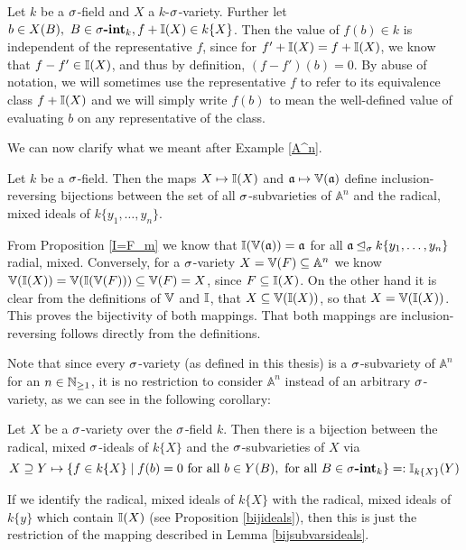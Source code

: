 \begin{rem}
Let $k$ be a $\sigma$-field and $X$ a $k$-$\sigma$-variety. Further let $b \in X(B), ~ B \in \sigma\text{{\normalfont\textbf{-int}}}_k, f + \mathbb{I}(X) \in k\{X\}$. Then the value of $f(b) \in k$ is independent of the representative $f$,
since for $f' + \mathbb{I}(X) = f + \mathbb{I}(X)$, we know that $f - f' \in \mathbb{I}(X)$, and thus by definition, $(f - f')(b) = 0$. By abuse of notation,
we will sometimes use the representative $f$ to refer to its equivalence class $f + \mathbb{I}(X)$ and we will simply write $f(b)$ to mean the well-defined value of evaluating $b$ on any representative of the class.
\end{rem}

We can now clarify what we meant after Example \ref{A^n}.

 \begin{lem}\label{bijsubvarsideals}
Let $k$ be a $\sigma$-field. Then the maps $X \mapsto \mathbb{I}(X)$ and $\mathfrak{a} \mapsto \mathbb{V}(\mathfrak{a})$ define inclusion-reversing bijections between the set of all $\sigma$-subvarieties of $\mathbb{A}^n$ and the radical, mixed ideals of $k\{y_1,\ldots,y_n\}$.
\begin{bew}
From Proposition \ref{I=F_m} we know that $\mathbb{I}(\mathbb{V}(\mathfrak{a})) = \mathfrak{a}$ for all $\mathfrak{a} \unlhd_{\sigma} k\{y_1,\ldots,y_n\}$ radial, mixed. Conversely, for a $\sigma$-variety $X = \mathbb{V}(F) \subseteq \mathbb{A}^n$ we know  $\mathbb{V}(\mathbb{I}(X)) = \mathbb{V}(\mathbb{I}(\mathbb{V}(F))) \subseteq \mathbb{V}(F) = X$,
 since $F \subseteq \mathbb{I}(X)$. On the other hand it is clear from the definitions of $\mathbb{V}$ and $ \mathbb{I}$, that $X \subseteq \mathbb{V}(\mathbb{I}(X))$, so that $X = \mathbb{V}(\mathbb{I}(X))$. This proves the bijectivity of both mappings. That both mappings are inclusion-reversing follows directly from the definitions.
\end{bew}
\end{lem}

Note that since every $\sigma$-variety (as defined in this thesis) is a $\sigma$-subvariety of $\mathbb{A}^n$ for an $n \in \mathbb{N}_{\geq1}$, it is no restriction to consider $\mathbb{A}^n$ instead of an arbitrary $\sigma$-variety, as we can see in the following corollary:
\begin{cor}
  Let $X$ be a $\sigma$-variety over the $\sigma$-field $k$. Then there is a bijection between the radical, mixed $\sigma$-ideals of $k\{X\}$ and the $\sigma$-subvarieties of $X$ via
 $$X \supseteq Y \mapsto \{f \in k\{X\} \mid f(b) = 0 \text{ for all } b \in Y(B), \text{ for all } B \in \sigma\text{{\normalfont\textbf{-int}}}_k \} =: \mathbb{I}_{k\{X\}}(Y)$$
\begin{bew}
If we identify the radical, mixed ideals of $k\{X\}$ with the radical, mixed ideals of $k\{y\}$ which contain $\mathbb{I}(X)$ (see Proposition \ref{bijideals}), then this is just the restriction of the mapping described in Lemma \ref{bijsubvarsideals}.
\end{bew}
\end{cor}

